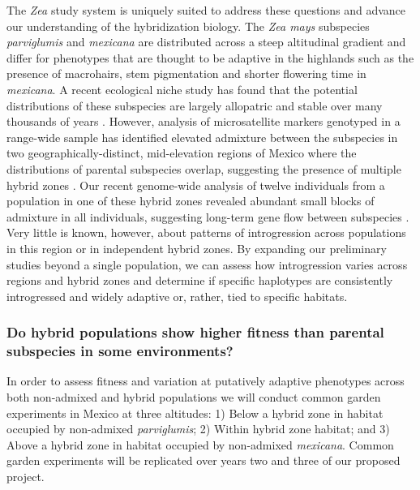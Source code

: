 The \emph{Zea} study system is uniquely suited to address these questions and advance our understanding of the hybridization biology.
The \emph {Zea mays} subspecies \emph{parviglumis} and \emph{mexicana} are distributed across a steep altitudinal gradient and differ for phenotypes that are thought to be adaptive in the highlands such as the presence of macrohairs, stem pigmentation and shorter flowering time in \emph{mexicana}.
A recent ecological niche study has found that the potential distributions of these subspecies are largely allopatric and stable over many thousands of years \citep{hufford2012inferences}.
However, analysis of microsatellite markers genotyped in a range-wide sample has identified elevated admixture between the subspecies in two geographically-distinct, mid-elevation regions of Mexico where the distributions of parental subspecies overlap, suggesting the presence of multiple hybrid zones \citep{Fukunaga2005}.  
Our recent genome-wide analysis of twelve individuals from a population in one of these hybrid zones revealed abundant small blocks of admixture in all individuals, suggesting long-term gene flow between subspecies \citep{Pyhajarvi2013}.  
Very little is known, however, about patterns of introgression across populations in this region or in independent hybrid zones.
By expanding our preliminary studies beyond a single population, we can assess how introgression varies across regions and hybrid zones and determine if specific haplotypes are consistently introgressed and widely adaptive or, rather, tied to specific habitats. 


\subsubsection{Do hybrid populations show higher fitness than parental subspecies in some environments?} 
\label{sss:fitness}


In order to assess fitness and variation at putatively adaptive phenotypes across both non-admixed and  hybrid populations we will conduct common garden experiments in Mexico at three altitudes: 1) Below a hybrid zone in habitat occupied by non-admixed \emph{parviglumis}; 2) Within hybrid zone habitat; and 3) Above a hybrid zone in habitat occupied by non-admixed \emph{mexicana}. 
Common garden experiments will be replicated over years two and three of our proposed project.  


